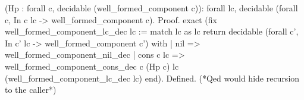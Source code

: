       (Hp : forall c, decidable (well_formed_component c)): 
forall lc, decidable (forall c, In c lc -> well_formed_component c).
Proof.
  exact (fix well_formed_component_lc_dec lc :=
   match lc as lc return 
    decidable (forall c', In c' lc -> well_formed_component c') with 
     | nil       => well_formed_component_nil_dec
     | cons c lc => well_formed_component_cons_dec c (Hp c) lc 
                                   (well_formed_component_lc_dec lc)
  end).
Defined.  (*Qed would hide recursion to the caller*) 